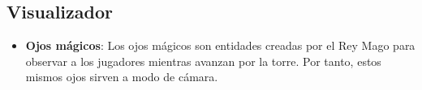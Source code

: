 \subsection{Visualizador}
\begin{itemize}
    \item \textbf{Ojos mágicos}: Los ojos mágicos son entidades creadas por el
    Rey Mago para observar a los jugadores mientras avanzan por la torre. Por
    tanto, estos mismos ojos sirven a modo de cámara.
\end{itemize}